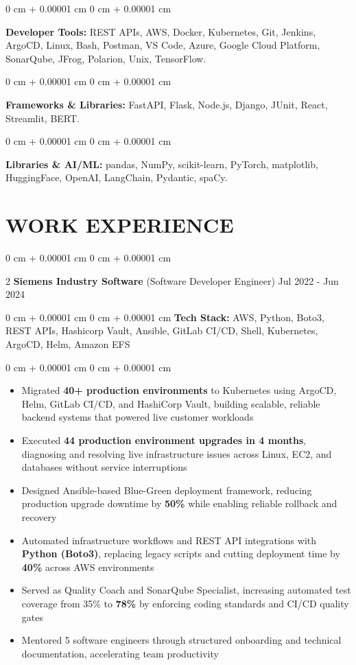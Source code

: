 \documentclass[9pt, letterpaper]{article}
\newenvironment{highlights}{
    \begin{itemize}[
        topsep=0.05 cm,
        parsep=0 pt,
        partopsep=0pt,
        itemsep=0pt,
        leftmargin=10pt
    ]
}{
    \end{itemize}
} %
\newenvironment{onecolentry}{
    \begin{adjustwidth}{
        0 cm + 0.00001 cm}{
        0 cm + 0.00001 cm}
}{
    \end{adjustwidth}
} %
\newenvironment{twocolentry}[2][]{
    \onecolentry
    \def\secondColumn{#2}
    \setcolumnwidth{\fill, 4.5 cm}
    \begin{paracol}{2}
}{
    \switchcolumn \raggedleft \secondColumn
    \end{paracol}
    \endonecolentry
} %
\begin{document}
    \begin{onecolentry}
    \textbf{Developer Tools:} REST APIs, AWS, Docker, Kubernetes, Git, Jenkins, ArgoCD, Linux, Bash, Postman, VS Code, Azure, Google Cloud Platform, SonarQube, JFrog, Polarion, Unix, TensorFlow.
    \end{onecolentry}

    \begin{onecolentry}
    \textbf{Frameworks \& Libraries:} FastAPI, Flask, Node.js, Django, JUnit, React, Streamlit, BERT.
    \end{onecolentry}

    \begin{onecolentry}
    \textbf{Libraries \& AI/ML:} pandas, NumPy, scikit-learn, PyTorch, matplotlib, HuggingFace, OpenAI, LangChain, Pydantic, spaCy.
    \end{onecolentry}


\section{WORK EXPERIENCE}

    \begin{twocolentry}{Jul 2022 - Jun 2024}\textbf{Siemens Industry Software} (Software Developer Engineer)\end{twocolentry}
    \begin{onecolentry}\textbf{Tech Stack:} AWS, Python, Boto3, REST APIs, Hashicorp Vault, Ansible, GitLab CI/CD, Shell, Kubernetes, ArgoCD, Helm, Amazon EFS \end{onecolentry}
    \begin{onecolentry}
        \begin{highlights}
            \item Migrated \textbf{40+ production environments} to Kubernetes using ArgoCD, Helm, GitLab CI/CD, and HashiCorp Vault, building scalable, reliable backend systems that powered live customer workloads
            \item Executed \textbf{44 production environment upgrades in 4 months}, diagnosing and resolving live infrastructure issues across Linux, EC2, and databases without service interruptions
            \item Designed Ansible-based Blue-Green deployment framework, reducing production upgrade downtime by \textbf{50\%} while enabling reliable rollback and recovery
            \item Automated infrastructure workflows and REST API integrations with \textbf{Python (Boto3)}, replacing legacy scripts and cutting deployment time by \textbf{40\%} across AWS environments
            \item Served as Quality Coach and SonarQube Specialist, increasing automated test coverage from 35\% to \textbf{78\%} by enforcing coding standards and CI/CD quality gates
            \item Mentored 5 software engineers through structured onboarding and technical documentation, accelerating team productivity
        \end{highlights}
    \end{onecolentry}
    \vspace{0.04 cm}
\end{document}
